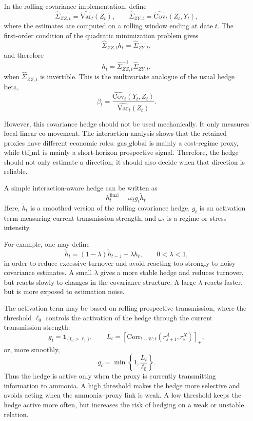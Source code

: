 \documentclass[11pt]{article}
\newcommand{\1}{\mathbf 1}
\begin{document}
In the rolling covariance implementation, define
\[
\widehat{\Sigma}_{ZZ,t}
=
\widehat{\mathrm{Var}}_t(Z_t),
\qquad
\widehat{\Sigma}_{ZY,t}
=
\widehat{\mathrm{Cov}}_t(Z_t,Y_t),
\]
where the estimates are computed on a rolling window ending at date $t$. The first-order condition of the quadratic minimization problem gives
\[
\widehat{\Sigma}_{ZZ,t} h_t
=
\widehat{\Sigma}_{ZY,t},
\]
and therefore
\[
h_t
=
\widehat{\Sigma}_{ZZ,t}^{-1}
\widehat{\Sigma}_{ZY,t},
\]
when $\widehat{\Sigma}_{ZZ,t}$ is invertible. This is the multivariate analogue of the usual hedge beta,
\[
\beta_t
=
\frac{\widehat{\mathrm{Cov}}_t(Y_t,Z_t)}
{\widehat{\mathrm{Var}}_t(Z_t)}.
\]

However, this covariance hedge should not be used mechanically. It only measures local linear co-movement. The interaction analysis shows that the retained proxies have different economic roles: $\mathrm{gas\_global}$ is mainly a cost-regime proxy, while $\mathrm{ttf\_m1}$ is mainly a short-horizon prospective signal. Therefore, the hedge should not only estimate a direction; it should also decide when that direction is reliable.

A simple interaction-aware hedge can be written as
\[
h_t^{\mathrm{final}}
=
\omega_t g_t \widetilde h_t.
\]
Here, $\widetilde h_t$ is a smoothed version of the rolling covariance hedge, $g_t$ is an activation term measuring current transmission strength, and $\omega_t$ is a regime or stress intensity.

For example, one may define
\[
\widetilde h_t
=
(1-\lambda)\widetilde h_{t-1}
+
\lambda h_t,
\qquad
0<\lambda<1,
\]
in order to reduce excessive turnover and avoid reacting too strongly to noisy covariance estimates. 
A small $\lambda$ gives a more stable hedge and reduces turnover, but reacts slowly to changes in the covariance structure. A large $\lambda$ reacts faster, but is more exposed to estimation noise.

The activation term may be based on rolling prospective transmission, where the threshold $\ell_0$ controls the activation of the hedge through the current transmission strength:
\[
g_t
=
\mathbf 1_{\{L_t > \ell_0\}},
\qquad
L_t
=
\left[
\mathrm{Corr}_{t-W:t}
\left(
r^A_{s+1}, r^X_s
\right)
\right]_+,
\]
or, more smoothly,
\[
g_t
=
\min\left\{1,\frac{L_t}{\ell_0}\right\}.
\]
Thus the hedge is active only when the proxy is currently transmitting information to ammonia. A high threshold makes the hedge more selective and avoids acting when the ammonia--proxy link is weak. A low threshold keeps the hedge active more often, but increases the risk of hedging on a weak or unstable relation.
\end{document}

